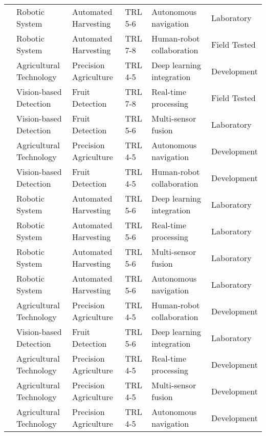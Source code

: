 \begin{table*}[htbp]
\begin{tabular}{@{}p{}p{}p{}p{}p{}p{}@{}}
\cite{bargoti2017image} & Robotic System & Automated Harvesting & TRL 5-6 & Autonomous navigation & Laboratory \\
\cite{ruckelshausen2009bonirob} & Robotic System & Automated Harvesting & TRL 7-8 & Human-robot collaboration & Field Tested \\
\cite{zhao2016tomato} & Agricultural Technology & Precision Agriculture & TRL 4-5 & Deep learning integration & Development \\
\cite{okamoto2007citrus} & Vision-based Detection & Fruit Detection & TRL 7-8 & Real-time processing & Field Tested \\
\cite{agricultural_robot_2020} & Vision-based Detection & Fruit Detection & TRL 5-6 & Multi-sensor fusion & Laboratory \\
\cite{chen2020apple} & Agricultural Technology & Precision Agriculture & TRL 4-5 & Autonomous navigation & Development \\
\cite{gongal2016apple} & Vision-based Detection & Fruit Detection & TRL 4-5 & Human-robot collaboration & Development \\
\cite{agricultural_robot_2020} & Robotic System & Automated Harvesting & TRL 5-6 & Deep learning integration & Laboratory \\
\cite{agricultural_robot_2020} & Robotic System & Automated Harvesting & TRL 5-6 & Real-time processing & Laboratory \\
\cite{agricultural_robot_2020} & Robotic System & Automated Harvesting & TRL 5-6 & Multi-sensor fusion & Laboratory \\
\cite{tomato_harvest_2021} & Robotic System & Automated Harvesting & TRL 5-6 & Autonomous navigation & Laboratory \\
\cite{apple_detection_2020} & Agricultural Technology & Precision Agriculture & TRL 4-5 & Human-robot collaboration & Development \\
\cite{agricultural_robot_2020} & Vision-based Detection & Fruit Detection & TRL 5-6 & Deep learning integration & Laboratory \\
\cite{apple_detection_2020} & Agricultural Technology & Precision Agriculture & TRL 4-5 & Real-time processing & Development \\
\cite{agricultural_robotics_2020} & Agricultural Technology & Precision Agriculture & TRL 4-5 & Multi-sensor fusion & Development \\
\cite{apple_detection_2020} & Agricultural Technology & Precision Agriculture & TRL 4-5 & Autonomous navigation & Development \\

\end{tabular}
\end{table*}
